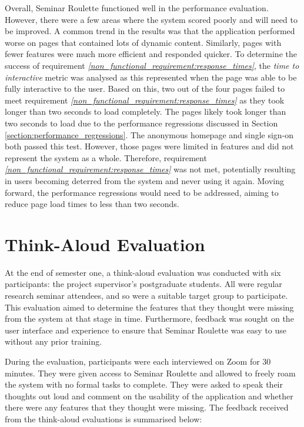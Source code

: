 \documentclass{l4proj}
\begin{document}
Overall, Seminar Roulette functioned well in the performance evaluation. However, there were a few areas where the system scored poorly and will need to be improved. A common trend in the results was that the application performed worse on pages that contained lots of dynamic content. Similarly, pages with fewer features were much more efficient and responded quicker. To determine the success of requirement \emph{\ref{non_functional_requirement:response_times}}, the \emph{time to interactive} metric was analysed as this represented when the page was able to be fully interactive to the user. Based on this, two out of the four pages failed to meet requirement \emph{\ref{non_functional_requirement:response_times}} as they took longer than two seconds to load completely. The pages likely took longer than two seconds to load due to the performance regressions discussed in Section \ref{section:performance_regressions}. The anonymous homepage and single sign-on both passed this test. However, those pages were limited in features and did not represent the system as a whole. Therefore, requirement \emph{\ref{non_functional_requirement:response_times}} was not met, potentially resulting in users becoming deterred from the system and never using it again. Moving forward, the performance regressions would need to be addressed, aiming to reduce page load times to less than two seconds.

\section{Think-Aloud Evaluation}
\label{section:think_aloud_evaluation}

At the end of semester one, a think-aloud evaluation was conducted with six participants: the project supervisor's postgraduate students. All were regular research seminar attendees, and so were a suitable target group to participate. This evaluation aimed to determine the features that they thought were missing from the system at that stage in time. Furthermore, feedback was sought on the user interface and experience to ensure that Seminar Roulette was easy to use without any prior training.

During the evaluation, participants were each interviewed on Zoom for 30 minutes. They were given access to Seminar Roulette and allowed to freely roam the system with no formal tasks to complete. They were asked to speak their thoughts out loud and comment on the usability of the application and whether there were any features that they thought were missing. The feedback received from the think-aloud evaluations is summarised below:
\end{document}
